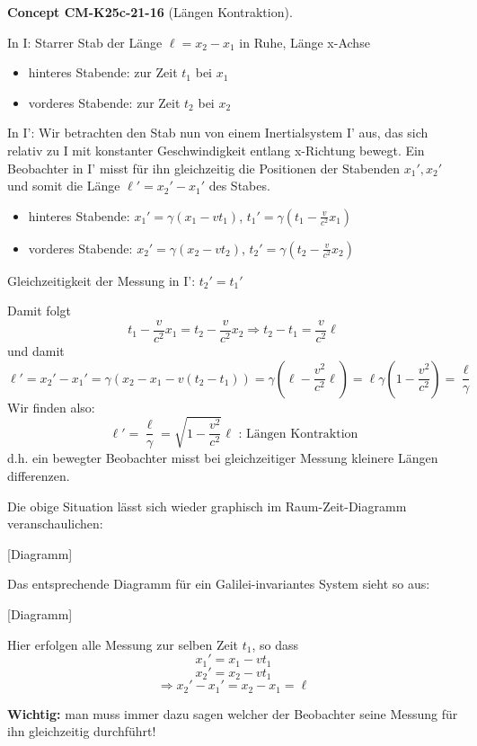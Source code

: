\documentclass[10pt, letterpaper]{article}
\newcommand{\CustomHeading}[3]{%
  \par\medskip\noindent%
  \textbf{#1 #2} \textnormal{(#3)}.\enskip%
}
\newenvironment{CONC}[2]{\CustomHeading{Concept}{#1}{#2}}{}
\begin{document}
\begin{CONC}{CM-K25c-21-16}{Längen Kontraktion}
In I: Starrer Stab der Länge $\ell = x_2-x_1$ in Ruhe, Länge x-Achse
\begin{itemize}
  \item hinteres Stabende: zur Zeit $t_1$ bei $x_1$

  \item vorderes Stabende: zur Zeit $t_2$ bei $x_2$
\end{itemize}



In I': Wir betrachten den Stab nun von einem Inertialsystem I' aus, das sich relativ zu I mit konstanter Geschwindigkeit entlang x-Richtung bewegt. Ein Beobachter in I' misst für ihn gleichzeitig die Positionen der Stabenden $x_1',x_2'$ und somit die Länge $\ell' = x_2'-x_1'$ des Stabes.

\begin{itemize}
  \item hinteres Stabende: $x_1' = \gamma(x_1-vt_1)$, $t_1' = \gamma(t_1-\frac{v}{c^2}x_1)$
  \item vorderes Stabende: $x_2' = \gamma(x_2-vt_2)$, $t_2' = \gamma(t_2-\frac{v}{c^2}x_2)$
\end{itemize}

Gleichzeitigkeit der Messung in I': $t_2'=t_1'$

Damit folgt
$$ t_1-\frac{v}{c^2}x_1 = t_2-\frac{v}{c^2}x_2 \Rightarrow t_2-t_1 = \frac{v}{c^2}\ell$$
und damit
$$ \ell' = x_2'-x_1' = \gamma(x_2-x_1-v(t_2-t_1)) = \gamma(\ell-\frac{v^2}{c^2}\ell) = \ell \gamma(1-\frac{v^2}{c^2}) = \frac{\ell}{\gamma}$$
Wir finden also:
$$\ell' = \frac{\ell}{\gamma} = \sqrt{1-\frac{v^2}{c^2}}\ell \text{ : Längen Kontraktion}$$
d.h. ein bewegter Beobachter misst bei gleichzeitiger Messung kleinere Längen differenzen.

Die obige Situation lässt sich wieder graphisch im Raum-Zeit-Diagramm veranschaulichen:

[Diagramm]

Das entsprechende Diagramm für ein Galilei-invariantes System sieht so aus:

[Diagramm]

Hier erfolgen alle Messung zur selben Zeit $t_1$, so dass
\[x_1'=x_1-vt_1\]
\[x_2'=x_2-vt_1\]
\[\Rightarrow x_2'-x_1'=x_2-x_1=\ell\]

\textbf{Wichtig:} man muss immer dazu sagen welcher der Beobachter seine Messung für ihn gleichzeitig durchführt!
\end{CONC}
\end{document}
